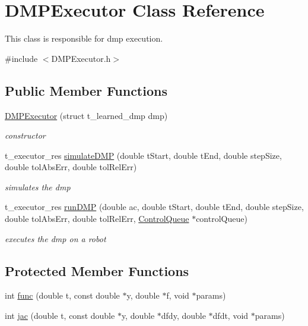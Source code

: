 \hypertarget{classDMPExecutor}{\section{\-D\-M\-P\-Executor \-Class \-Reference}
\label{classDMPExecutor}
}


\-This class is responsible for dmp execution.  




{\ttfamily \#include $<$\-D\-M\-P\-Executor.\-h$>$}

\subsection*{\-Public \-Member \-Functions}
\begin{DoxyCompactItemize}
\item 
\hyperlink{classDMPExecutor_af5b812ae01ae17b1f82e01af41f2a7f5}{\-D\-M\-P\-Executor} (struct t\-\_\-learned\-\_\-dmp dmp)
\begin{DoxyCompactList}\small\item\em constructor \end{DoxyCompactList}\item 
t\-\_\-executor\-\_\-res \hyperlink{classDMPExecutor_a879428006706b25f5da2109b0608b41e}{simulate\-D\-M\-P} (double t\-Start, double t\-End, double step\-Size, double tol\-Abs\-Err, double tol\-Rel\-Err)
\begin{DoxyCompactList}\small\item\em simulates the dmp \end{DoxyCompactList}\item 
t\-\_\-executor\-\_\-res \hyperlink{classDMPExecutor_a532d85a4a83bec2c28b6c15518b10927}{run\-D\-M\-P} (double ac, double t\-Start, double t\-End, double step\-Size, double tol\-Abs\-Err, double tol\-Rel\-Err, \hyperlink{classControlQueue}{\-Control\-Queue} $\ast$control\-Queue)
\begin{DoxyCompactList}\small\item\em executes the dmp on a robot \end{DoxyCompactList}\end{DoxyCompactItemize}
\subsection*{\-Protected \-Member \-Functions}
\begin{DoxyCompactItemize}
\item 
int \hyperlink{classDMPExecutor_a2e2f614c8f2242136dbcfcb4178d34d4}{func} (double t, const double $\ast$y, double $\ast$f, void $\ast$params)
\item 
int \hyperlink{classDMPExecutor_a228de59529572c211a66e7b7321cacda}{jac} (double t, const double $\ast$y, double $\ast$dfdy, double $\ast$dfdt, void $\ast$params)
\end{DoxyCompactItemize}


